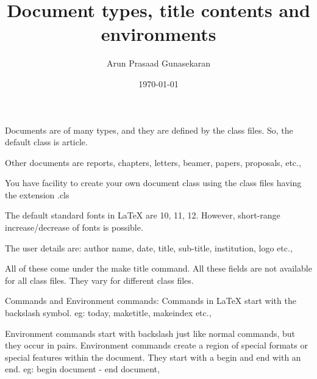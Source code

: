 \documentclass[10pt,a4paper]{article}
\author{Arun Prasaad Gunasekaran}
\title{Document types, title contents and environments}
\date{\today}
\begin{document}
\maketitle

Documents are of many types, and they are defined by the class files. So, the default class is article.

Other documents are reports, chapters, letters, beamer, papers, proposals, etc.,

You have facility to create your own document class using the class files having the extension .cls

The default standard fonts in LaTeX are 10, 11, 12. However, short-range increase/decrease of fonts is possible.

The user details are: author name, date, title, sub-title, institution, logo etc.,

All of these come under the make title command. All these fields are not available for all class files. They vary for different class files.

Commands and Environment commands:
Commands in LaTeX start with the backslash symbol. eg: today, maketitle, makeindex etc.,

Environment commands start with backslash just like normal commands, but they occur in pairs. Environment commands create a region of special formats or special features within the document. They start with a begin and end with an end.
eg: begin document - end document, 
\end{document}
